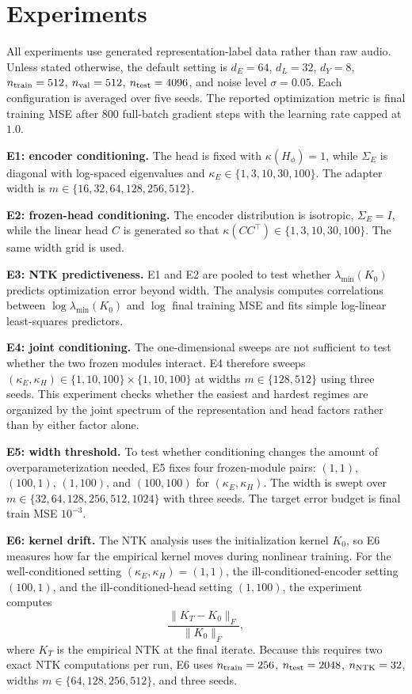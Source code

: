\documentclass[10pt,a4paper]{article}
\begin{document}
\section{Experiments}
All experiments use generated representation-label data rather than raw audio.  Unless stated otherwise,
the default setting is
$d_E=64$, $d_L=32$, $d_Y=8$, $n_{\rm train}=512$, $n_{\rm val}=512$, $n_{\rm test}=4096$, and noise
level $\sigma=0.05$.  Each configuration is averaged over five seeds.  The reported optimization metric
is final training MSE after 800 full-batch gradient steps with the learning rate capped at $1.0$.

\textbf{E1: encoder conditioning.}  The head is fixed with $\kappa(H_\phi)=1$, while
$\Sigma_E$ is diagonal with log-spaced eigenvalues and
$\kappa_E\in\{1,3,10,30,100\}$.  The adapter width is
$m\in\{16,32,64,128,256,512\}$.

\textbf{E2: frozen-head conditioning.}  The encoder distribution is isotropic, $\Sigma_E=I$, while the
linear head $C$ is generated so that $\kappa(CC^\top)\in\{1,3,10,30,100\}$.  The same width grid is used.

\textbf{E3: NTK predictiveness.}  E1 and E2 are pooled to test whether $\lambda_{\min}(K_0)$ predicts
optimization error beyond width.  The analysis computes correlations between $\log\lambda_{\min}(K_0)$ and
$\log$ final training MSE and fits simple log-linear least-squares predictors.

\textbf{E4: joint conditioning.}  The one-dimensional sweeps are not sufficient to test whether the two
frozen modules interact.  E4 therefore sweeps
$(\kappa_E,\kappa_H)\in\{1,10,100\}\times\{1,10,100\}$ at widths $m\in\{128,512\}$ using three seeds.
This experiment checks whether the easiest and hardest regimes are organized by the joint spectrum of the
representation and head factors rather than by either factor alone.

\textbf{E5: width threshold.}  To test whether conditioning changes the amount of overparameterization
needed, E5 fixes four frozen-module pairs:
$(1,1)$, $(100,1)$, $(1,100)$, and $(100,100)$ for $(\kappa_E,\kappa_H)$.  The width is swept over
$m\in\{32,64,128,256,512,1024\}$ with three seeds.  The target error budget is final train MSE
$10^{-3}$.

\textbf{E6: kernel drift.}  The NTK analysis uses the initialization kernel $K_0$, so E6 measures how far
the empirical kernel moves during nonlinear training.  For the well-conditioned setting
$(\kappa_E,\kappa_H)=(1,1)$, the ill-conditioned-encoder setting $(100,1)$, and the
ill-conditioned-head setting $(1,100)$, the experiment computes
\[
    \frac{\|K_T-K_0\|_F}{\|K_0\|_F},
\]
where $K_T$ is the empirical NTK at the final iterate.  Because this requires two exact NTK computations
per run, E6 uses $n_{\rm train}=256$, $n_{\rm test}=2048$, $n_{\rm NTK}=32$, widths
$m\in\{64,128,256,512\}$, and three seeds.
\end{document}
